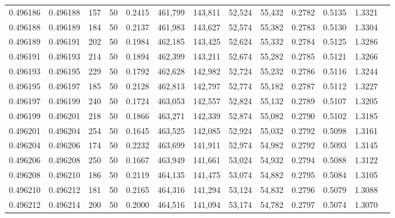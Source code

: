 \begin{tabular}{rrrrrrrrrrrrr}
0.496186 & 0.496188 &   157 &  50 &                                     0.2415 & 461,799 & 143,811 &  52,524 &  55,432 & 0.2782 & 0.5135 & 1.3321 \\
0.496188 & 0.496189 &   184 &  50 &                                     0.2137 & 461,983 & 143,627 &  52,574 &  55,382 & 0.2783 & 0.5130 & 1.3304 \\
0.496189 & 0.496191 &   202 &  50 &                                     0.1984 & 462,185 & 143,425 &  52,624 &  55,332 & 0.2784 & 0.5125 & 1.3286 \\
0.496191 & 0.496193 &   214 &  50 &                                     0.1894 & 462,399 & 143,211 &  52,674 &  55,282 & 0.2785 & 0.5121 & 1.3266 \\
0.496193 & 0.496195 &   229 &  50 &                                     0.1792 & 462,628 & 142,982 &  52,724 &  55,232 & 0.2786 & 0.5116 & 1.3244 \\
0.496195 & 0.496197 &   185 &  50 &                                     0.2128 & 462,813 & 142,797 &  52,774 &  55,182 & 0.2787 & 0.5112 & 1.3227 \\
0.496197 & 0.496199 &   240 &  50 &                                     0.1724 & 463,053 & 142,557 &  52,824 &  55,132 & 0.2789 & 0.5107 & 1.3205 \\
0.496199 & 0.496201 &   218 &  50 &                                     0.1866 & 463,271 & 142,339 &  52,874 &  55,082 & 0.2790 & 0.5102 & 1.3185 \\
0.496201 & 0.496204 &   254 &  50 &                                     0.1645 & 463,525 & 142,085 &  52,924 &  55,032 & 0.2792 & 0.5098 & 1.3161 \\
0.496204 & 0.496206 &   174 &  50 &                                     0.2232 & 463,699 & 141,911 &  52,974 &  54,982 & 0.2792 & 0.5093 & 1.3145 \\
0.496206 & 0.496208 &   250 &  50 &                                     0.1667 & 463,949 & 141,661 &  53,024 &  54,932 & 0.2794 & 0.5088 & 1.3122 \\
0.496208 & 0.496210 &   186 &  50 &                                     0.2119 & 464,135 & 141,475 &  53,074 &  54,882 & 0.2795 & 0.5084 & 1.3105 \\
0.496210 & 0.496212 &   181 &  50 &                                     0.2165 & 464,316 & 141,294 &  53,124 &  54,832 & 0.2796 & 0.5079 & 1.3088 \\
0.496212 & 0.496214 &   200 &  50 &                                     0.2000 & 464,516 & 141,094 &  53,174 &  54,782 & 0.2797 & 0.5074 & 1.3070 \\

\end{tabular}
